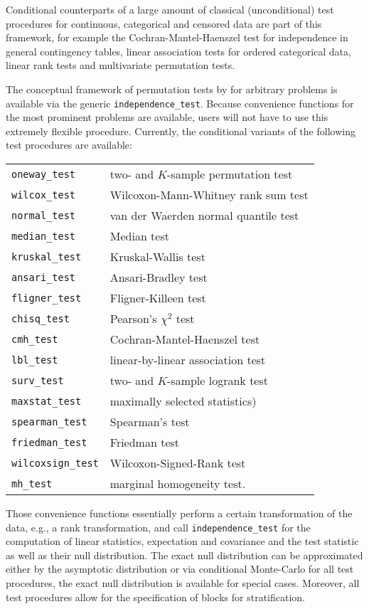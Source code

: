 \documentclass[letter]{article}
\begin{document}
Conditional counterparts of a large amount of classical (unconditional) 
test procedures for 
continuous, categorical and censored data are part of this framework, for
example the Cochran-Mantel-Haenszel test for independence in general
contingency tables, linear association tests for ordered categorical 
data, linear rank tests and multivariate permutation tests.

The conceptual framework of permutation tests by \cite{StrasserWeber1999}
for arbitrary problems is available via the generic
\texttt{independence\_test}. Because convenience functions for the most
prominent problems are available, users will not have to use this
extremely flexible procedure. Currently, the conditional variants of the 
following test procedures are available: 
\begin{center}
\begin{tabular}{ll}
\texttt{oneway\_test} & two- and $K$-sample permutation test \\
\texttt{wilcox\_test} & Wilcoxon-Mann-Whitney rank sum test \\
\texttt{normal\_test} & van der Waerden normal quantile test \\
\texttt{median\_test} & Median test \\
\texttt{kruskal\_test} & Kruskal-Wallis test \\
\texttt{ansari\_test} & Ansari-Bradley test \\
\texttt{fligner\_test} & Fligner-Killeen test \\
\texttt{chisq\_test} & Pearson's $\chi^2$ test \\
\texttt{cmh\_test} & Cochran-Mantel-Haenszel test \\
\texttt{lbl\_test} & linear-by-linear association test \\
\texttt{surv\_test} & two- and $K$-sample logrank test \\
\texttt{maxstat\_test} & maximally selected statistics) \\
\texttt{spearman\_test} & Spearman's test \\
\texttt{friedman\_test} & Friedman test \\
\texttt{wilcoxsign\_test} & Wilcoxon-Signed-Rank test \\
\texttt{mh\_test} &  marginal homogeneity test. \\
\end{tabular}
\end{center}

Those convenience functions essentially perform a certain transformation of
the data, e.g., a rank transformation, and call \texttt{independence\_test}
for the computation of linear statistics, expectation and covariance and the
test statistic as well as 
their null distribution. The exact null distribution can
be approximated either by the asymptotic distribution or via conditional
Monte-Carlo for all test procedures, the exact null distribution is
available for special cases. Moreover, all test procedures allow for the
specification of blocks for stratification.
\end{document}

